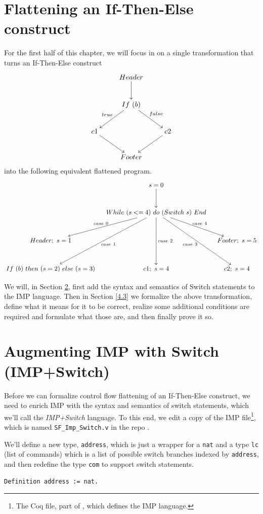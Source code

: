 \documentclass[12pt,notitlepage]{report}
\theoremstyle{plain}
\theoremstyle{definition}
\newcommand{\define}[1]{\emph{#1}\index{#1}}
\numberwithin{equation}{section}
\begin{document}
\section{Flattening an If-Then-Else construct}
For the first half of this chapter, we will focus in on a single transformation that turns an If-Then-Else construct
\[
\xymatrix{
& Header \ar[d] & \\
& If\ (b) \ar[dl]_{true} \ar[dr]^{false} & \\
c1\ar[dr] & & c2\ar[dl] \\
& Footer &
}
\]
into the following equivalent flattened program.
\[
\xymatrixrowsep{1cm}
\xymatrixcolsep{0.4cm}
\xymatrix{
 &  s = 0 \ar[d]  & \\
  & While\ (s <= 4)\ do\ (Switch\ s)\ End \ar[dl]_{case\ 0} \ar[ddl]^{case\ 1} \ar[dd]^{case\ 2} \ar[ddr]_{case \ 3} \ar[dr]^{case\ 4}  & \\
Header;\ s = 1 &   & Footer;\ s = 5 \\
If\ (b)\ then\ (s = 2)\ else\ (s = 3)& c1;\ s = 4& c2 ;\ s = 4}
\]

We will, in Section \ref{4.2}, first add the syntax and semantics of Switch statements to the IMP language.  Then in Section \ref{4.3} we formalize the above transformation, define what it means for it to be correct, realize some additional conditions are required and formulate what those are, and then finally prove it so.


\section{Augmenting IMP with Switch (IMP+Switch)}\label{4.2}
Before we can formalize control flow flattening of an If-Then-Else construct, we need to enrich IMP with the syntax and semantics of switch statements, which we'll call the \define{IMP+Switch} language.  To this end, we edit a copy of the IMP file\footnote{The Coq file, part of \cite{Pier}, which defines the IMP language.}, which is named \verb$SF_Imp_Switch.v$ in the repo \cite{repo}.

\par We'll define a new type, \verb$address$, which is just a wrapper for a \verb$nat$ and a type \verb$lc$ (list of commands) which is a list of possible switch branches indexed by \verb$address$, and then redefine the type \verb$com$ to support switch statements.

\begin{verbatim}
Definition address := nat.
\end{verbatim}
\end{document}
